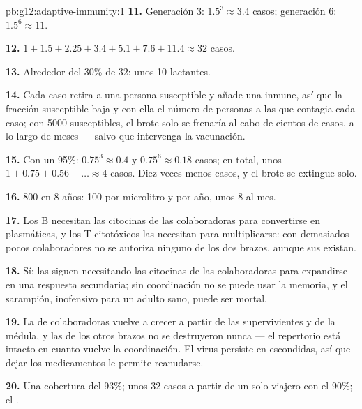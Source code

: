 \begin{solution}{pb:g12:adaptive-immunity:1}
\textbf{11.} Generación 3: $1.5^3 \approx 3.4$ casos; generación 6:
$1.5^6 \approx 11$.

\textbf{12.} $1 + 1.5 + 2.25 + 3.4 + 5.1 + 7.6 + 11.4 \approx 32$
casos.

\textbf{13.} Alrededor del 30\% de 32: unos 10 lactantes.

\textbf{14.} Cada caso retira a una persona susceptible y añade una
inmune, así que la fracción susceptible baja y con ella el número de
personas a las que contagia cada caso; con 5000 susceptibles, el brote
solo se frenaría al cabo de cientos de casos, a lo largo de meses ---
salvo que intervenga la vacunación.

\textbf{15.} Con un 95\%: $0.75^3 \approx 0.4$ y $0.75^6 \approx 0.18$
casos; en total, unos $1 + 0.75 + 0.56 + \dots \approx 4$ casos. Diez
veces menos casos, y el brote se extingue solo.

\textbf{16.} 800 en 8 años: 100 por microlitro y por año, unos 8 al
mes.

\textbf{17.} Los  B necesitan las citocinas de las 
colaboradoras para convertirse en  plasmáticas, y los T
citotóxicos las necesitan para multiplicarse: con demasiados pocos
colaboradores no se autoriza ninguno de los dos brazos, aunque sus
 existan.

\textbf{18.} Sí: las  siguen necesitando las
citocinas de las colaboradoras para expandirse en una respuesta
secundaria; sin coordinación no se puede usar la memoria, y el
sarampión, inofensivo para un adulto sano, puede ser mortal.

\textbf{19.} La  de colaboradoras vuelve a crecer a partir de
las  supervivientes y de la médula, y las  de
los otros brazos no se destruyeron nunca --- el repertorio está intacto
en cuanto vuelve la coordinación. El virus persiste en 
escondidas, así que dejar los medicamentos le permite reanudarse.

\textbf{20.} Una cobertura del 93\%; unos 32 casos a partir de un solo
viajero con el 90\%; el .
\end{solution}
